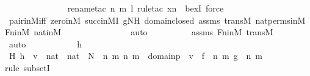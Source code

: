 \begin{isabellebody}
\ \ \ \ \ \ \ \ \ \ \ \ \ \ \isamarkupfalse%
{\isacharparenleft}{\kern0pt}rename{\isacharunderscore}{\kern0pt}tac\ n\ m\ l{\isacharcomma}{\kern0pt}\ rule{\isacharunderscore}{\kern0pt}tac\ x{\isacharequal}{\kern0pt}{\isachardoublequoteopen}n{\isachardoublequoteclose}\ \ bexI{\isacharcomma}{\kern0pt}\ force{\isacharparenright}{\kern0pt}\isanewline
\ \ \ \ \ \ \ \ \isamarkupfalse%
\ pair{\isacharunderscore}{\kern0pt}in{\isacharunderscore}{\kern0pt}M{\isacharunderscore}{\kern0pt}iff\ zero{\isacharunderscore}{\kern0pt}in{\isacharunderscore}{\kern0pt}M\ succ{\isacharunderscore}{\kern0pt}in{\isacharunderscore}{\kern0pt}MI\ gNH\ domain{\isacharunderscore}{\kern0pt}closed\ assms\ transM\ nat{\isacharunderscore}{\kern0pt}perms{\isacharunderscore}{\kern0pt}in{\isacharunderscore}{\kern0pt}M\ Fn{\isacharunderscore}{\kern0pt}in{\isacharunderscore}{\kern0pt}M\ nat{\isacharunderscore}{\kern0pt}in{\isacharunderscore}{\kern0pt}M\isanewline
\ \ \ \ \ \ \ \ \ \ \ \ \ \ \isamarkupfalse%
\ auto{\isacharbrackleft}{\kern0pt}{}{\isacharbrackright}{\kern0pt}\isanewline
\ \ \ \ \ \ \ \ \isamarkupfalse%
\ assms\ Fn{\isacharunderscore}{\kern0pt}in{\isacharunderscore}{\kern0pt}M\ transM\isanewline
\ \ \ \ \ \ \ \ \isamarkupfalse%
\ auto\isanewline
\ \ \ \ \ \ \isamarkupfalse%
\ \isamarkupfalse%
\ {\isachardoublequoteopen}{\isachardot}{\kern0pt}{\isachardot}{\kern0pt}{\isachardot}{\kern0pt}\ {\isacharequal}{\kern0pt}\ h{\isachardoublequoteclose}\ \isanewline
\ \ \ \ \ \ \isamarkupfalse%
\ {\isacharminus}{\kern0pt}\ \isanewline
\ \ \ \ \ \ \ \ \isamarkupfalse%
\ H{\isacharcolon}{\kern0pt}\ {\isachardoublequoteopen}h\ {\isasymsubseteq}\ {\isacharbraceleft}{\kern0pt}v\ {\isasymin}\ {\isacharparenleft}{\kern0pt}nat\ {\isasymtimes}\ nat{\isacharparenright}{\kern0pt}\ {\isasymtimes}\ N\ {\isachardot}{\kern0pt}\ {\isasymexists}n\ m{\isachardot}{\kern0pt}\ {\isasymlangle}n{\isacharcomma}{\kern0pt}\ m{\isasymrangle}\ {\isasymin}\ domain{\isacharparenleft}{\kern0pt}p{\isacharparenright}{\kern0pt}\ {\isasymand}\ v\ {\isacharequal}{\kern0pt}\ {\isasymlangle}{\isasymlangle}f\ {\isacharbackquote}{\kern0pt}\ n{\isacharcomma}{\kern0pt}\ m{\isasymrangle}{\isacharcomma}{\kern0pt}\ g\ {\isacharbackquote}{\kern0pt}\ {\isasymlangle}n{\isacharcomma}{\kern0pt}\ m{\isasymrangle}{\isasymrangle}{\isacharbraceright}{\kern0pt}{\isachardoublequoteclose}\ \isanewline
\ \ \ \ \ \ \ \ \isamarkupfalse%
{\isacharparenleft}{\kern0pt}rule\ subsetI{\isacharparenright}{\kern0pt}\ \isanewline

\end{isabellebody}
